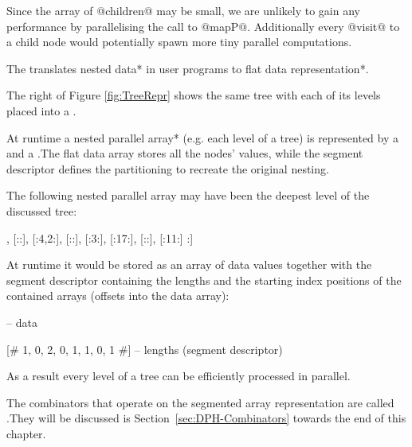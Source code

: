 \documentclass[preamble.tex]{subfiles}
\begin{document}
Since the array of @children@ may be small, we are unlikely to gain any performance by parallelising the call to @mapP@. Additionally every @visit@ to a child node would potentially spawn more tiny parallel computations. 

\begin{bluebox}
The  translates \*nested data* in user programs to \*flat data representation*.
\end{bluebox}

The right of Figure \ref{fig:TreeRepr} shows the same tree with each of its levels placed into a .

At runtime a \*nested parallel array* (e.g. each level of a tree) is represented by a  and a .\isegd The flat data array stores all the nodes' values, while the segment descriptor defines the partitioning to recreate the original nesting.

The following nested parallel array may have been the deepest level of the discussed tree:

\begin{hscode}
[: [:5:], [::], [:4,2:], [::], [:3:], [:17:], [::], [:11:] :]
\end{hscode}

At runtime it would be stored as an array of data values together with the segment descriptor containing the lengths and the starting index positions of the contained arrays (offsets into the data array):%

\begin{hscode}
[# 5, 4, 2, 3, 17, 11 #]       -- data

[# 1, 0, 2, 0, 1, 1, 0, 1 #]   -- lengths (segment descriptor)
\end{hscode}

As a result every level of a tree can be efficiently processed in parallel.

The combinators that operate on the segmented array representation are called .\isegcomb They will be discussed is Section~\ref{sec:DPH-Combinators} towards the end of this chapter.
\end{document}
